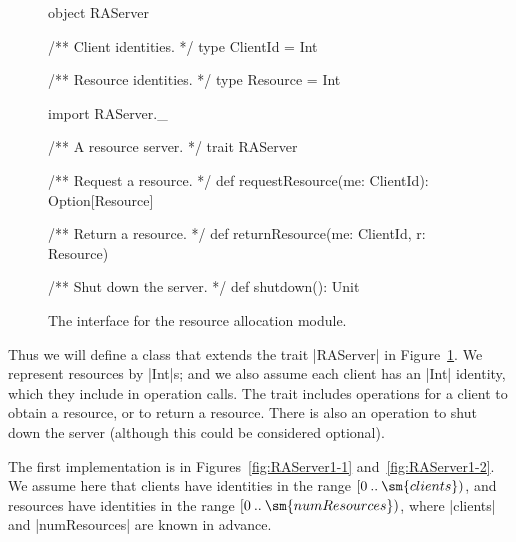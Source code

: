 \begin{figure}
\begin{scala}
object RAServer{
  /** Client identities. */
  type ClientId = Int

  /** Resource identities. */
  type Resource = Int
}

import RAServer._

/** A resource server. */
trait RAServer{
  /** Request a resource. */
  def requestResource(me: ClientId): Option[Resource]

  /** Return a resource. */
  def returnResource(me: ClientId, r: Resource) 

  /** Shut down the server. */
  def shutdown(): Unit
} 
\end{scala}
\caption{The interface for the resource allocation module.}
\label{fig:RAServer}
\end{figure}


Thus we will define a class that extends the trait |RAServer| in
Figure~\ref{fig:RAServer}.  We represent resources by |Int|s; and we also
assume each client has an |Int| identity, which they include in operation
calls.  The trait includes operations for a client to obtain a resource, or to
return a resource.  There is also an operation to shut down the server
(although this could be considered optional).


The first implementation is in Figures~\ref{fig:RAServer1-1}
and~\ref{fig:RAServer1-2}.  We assume here that clients have identities in the
range $\interval0{\sm{clients}}$, and resources have identities in the range
$\interval0{\sm{numResources}}$, where |clients| and |numResources| are known
in advance.


